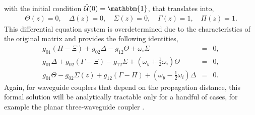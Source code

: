 \documentclass[9pt,twocolumn,twoside]{osajnl}
\begin{document}
with the initial condition $\hat{\mathcal{U}}(0) = \mathbbm{1}$, that translates into,
\begin{eqnarray}
\Theta(z)= 0 , \quad \Delta(z) =  0, \quad \Sigma(z)= 0, \quad
\Gamma(z)= 1, \quad \Pi(z)= 1. \label{eq:initsb}
\end{eqnarray}
This differential equation system is overdetermined due to the characteristics of the original matrix and provides the following identities,
\begin{eqnarray}
g_{01} \left( \Pi - \Xi \right) + g_{02} \Delta - g_{12} \Theta + \omega_{i} \Sigma &=& 0, \\
g_{01} \Delta + g_{02} \left( \Gamma - \Xi \right) - g_{12} \Sigma + \left(  \omega_{y} +\frac{1}{2}\omega_{i}   \right) \Theta &=& 0, \\
g_{01} \Theta - g_{02} \Sigma(z) + g_{12} \left( \Gamma - \Pi \right)  + \left(  \omega_{y} - \frac{1}{2}\omega_{i}\right) \Delta &=& 0. 
\end{eqnarray}
Again, for waveguide couplers that depend on the propagation distance, this formal solution will be analytically tractable only for a handful of cases, for example the planar three-waveguide coupler \cite{RodriguezLara2014p013802}. 

\end{document}
